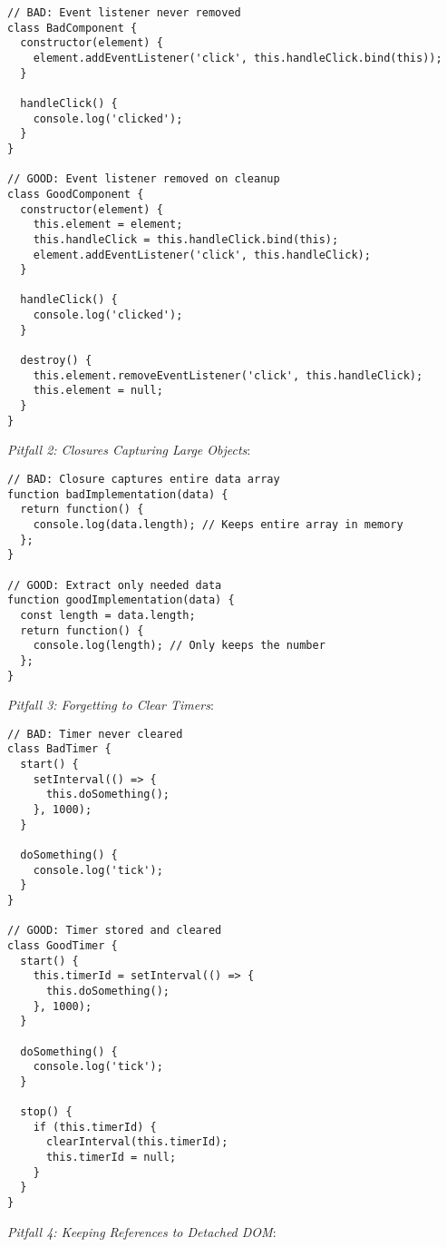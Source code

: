 \documentclass[11pt]{article}
\begin{document}
\begin{verbatim}
// BAD: Event listener never removed
class BadComponent {
  constructor(element) {
    element.addEventListener('click', this.handleClick.bind(this));
  }
  
  handleClick() {
    console.log('clicked');
  }
}

// GOOD: Event listener removed on cleanup
class GoodComponent {
  constructor(element) {
    this.element = element;
    this.handleClick = this.handleClick.bind(this);
    element.addEventListener('click', this.handleClick);
  }
  
  handleClick() {
    console.log('clicked');
  }
  
  destroy() {
    this.element.removeEventListener('click', this.handleClick);
    this.element = null;
  }
}
\end{verbatim}

\emph{Pitfall 2: Closures Capturing Large Objects}:

\begin{verbatim}
// BAD: Closure captures entire data array
function badImplementation(data) {
  return function() {
    console.log(data.length); // Keeps entire array in memory
  };
}

// GOOD: Extract only needed data
function goodImplementation(data) {
  const length = data.length;
  return function() {
    console.log(length); // Only keeps the number
  };
}
\end{verbatim}

\emph{Pitfall 3: Forgetting to Clear Timers}:

\begin{verbatim}
// BAD: Timer never cleared
class BadTimer {
  start() {
    setInterval(() => {
      this.doSomething();
    }, 1000);
  }
  
  doSomething() {
    console.log('tick');
  }
}

// GOOD: Timer stored and cleared
class GoodTimer {
  start() {
    this.timerId = setInterval(() => {
      this.doSomething();
    }, 1000);
  }
  
  doSomething() {
    console.log('tick');
  }
  
  stop() {
    if (this.timerId) {
      clearInterval(this.timerId);
      this.timerId = null;
    }
  }
}
\end{verbatim}

\emph{Pitfall 4: Keeping References to Detached DOM}:
\end{document}
